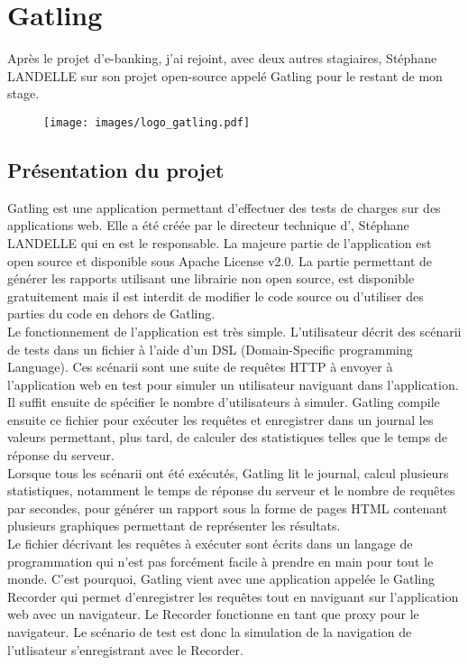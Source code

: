 \section{Gatling}

Après le projet d'e-banking, j'ai rejoint, avec deux autres stagiaires, Stéphane LANDELLE sur son projet open-source appelé Gatling \cite{gatling} pour le restant de mon stage.

\begin{figure}[H]
 \centering
 \texttt{[image: images/logo\_gatling.pdf]}
\end{figure}


\subsection{Présentation du projet}

Gatling est une application permettant d'effectuer des tests de charges sur des applications web. Elle a été créée par le directeur technique d'\ebi{}, Stéphane LANDELLE qui en est le responsable. La majeure partie de l'application est open source et disponible sous Apache License v2.0. La partie permettant de générer les rapports utilisant une librairie non open source, est disponible gratuitement mais il est interdit de modifier le code source ou d'utiliser des parties du code en dehors de Gatling.\\

Le fonctionnement de l'application est très simple. L'utilisateur décrit des scénarii de tests dans un fichier à l'aide d'un DSL (Domain-Specific programming Language). Ces scénarii sont une suite de requêtes HTTP à envoyer à l'application web en test pour simuler un utilisateur naviguant dans l'application. Il suffit ensuite de spécifier le nombre d'utilisateurs à simuler. Gatling compile ensuite ce fichier pour exécuter les requêtes et enregistrer dans un journal les valeurs permettant, plus tard, de calculer des statistiques telles que le temps de réponse du serveur.\\

Lorsque tous les scénarii ont été exécutés, Gatling lit le journal, calcul plusieurs statistiques, notamment le temps de réponse du serveur et le nombre de requêtes par secondes, pour générer un rapport sous la forme de pages HTML contenant plusieurs graphiques permettant de représenter les résultats.\\

Le fichier décrivant les requêtes à exécuter sont écrits dans un langage de programmation qui n'est pas forcément facile à prendre en main pour tout le monde. C'est pourquoi, Gatling vient avec une application appelée le Gatling Recorder qui permet d'enregistrer les requêtes tout en naviguant sur l'application web avec un navigateur. Le Recorder fonctionne en tant que proxy pour le navigateur. Le scénario de test est donc la simulation de la navigation de l'utlisateur s'enregistrant avec le Recorder.\\

